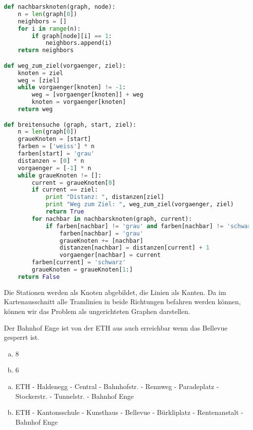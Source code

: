 \begin{lsg}
\hfill
\begin{lstlisting}[language=Python,basicstyle=\small,tabsize=3]
def nachbarsknoten(graph, node):
	n = len(graph[0])
	neighbors = []
	for i in range(n):
		if graph[node][i] == 1:
			neighbors.append(i)
	return neighbors

def weg_zum_ziel(vorgaenger, ziel):
	knoten = ziel
	weg = [ziel]	
	while vorgaenger[knoten] != -1:
		weg = [vorgaenger[knoten]] + weg
		knoten = vorgaenger[knoten]
	return weg

def breitensuche (graph, start, ziel):
	n = len(graph[0])
	graueKnoten = [start]
	farben = ['weiss'] * n
	farben[start] = 'grau'
	distanzen = [0] * n
	vorgaenger = [-1] * n
	while graueKnoten != []:
		current = graueKnoten[0]
		if current == ziel:
			print "Distanz: ", distanzen[ziel]
			print "Weg zum Ziel: ", weg_zum_ziel(vorgaenger, ziel)
			return True
		for nachbar in nachbarsknoten(graph, current):
			if farben[nachbar] != 'grau' and farben[nachbar] != 'schwarz':
				farben[nachbar] = 'grau'
				graueKnoten += [nachbar]
				distanzen[nachbar] = distanzen[current] + 1
				vorgaenger[nachbar] = current
		farben[current] = 'schwarz'
		graueKnoten = graueKnoten[1:]
	return False
\end{lstlisting}
\end{lsg}

\begin{lsg}
Die Stationen werden als Knoten abgebildet, die Linien als Kanten. Da im Kartenausschnitt alle Tramlinien in beide Richtungen befahren werden k\"onnen, k\"onnen wir das Problem als ungerichteten Graphen darstellen.
\end{lsg}

\begin{lsg}
Der Bahnhof Enge ist von der ETH aus auch erreichbar wenn das Bellevue gesperrt ist.
\end{lsg}

\begin{lsg}
\hfill
\begin{enumerate}[(a)]
\item 8
\item 6
\end{enumerate}\end{lsg}

\begin{lsg}
\hfill
\begin{enumerate}[(a)]
\item ETH - Haldenegg - Central - Bahnhofstr. - Rennweg - Paradeplatz - Stockerstr. - Tunnelstr. - Bahnhof Enge
\item ETH - Kantonsschule - Kunsthaus - Bellevue - B\"urkliplatz - Rentenanstalt - Bahnhof Enge
\end{enumerate}\end{lsg}


